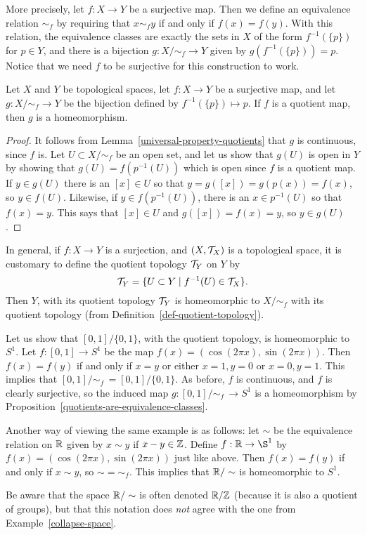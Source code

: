 More precisely, let $f :X \to Y$ be a surjective map. Then we define an equivalence relation $\sim_f$ by requiring that $x \sim_f y$ if and only if $f(x) = f(y)$. With this relation, the equivalence classes are exactly the sets in $X$ of the form $f^{-1}(\{p\})$ for $p \in Y$, and there is a bijection $g: X/\!\sim_f \to Y$ given by $g(f^{-1}(\{p\})) = p$. Notice that we need $f$ to be surjective for this construction to work.
\begin{prop}
  \label{quotients-are-equivalence-classes}
  Let $X$ and $Y$ be topological spaces, let $f : X \to Y$ be a surjective map, and let $g : X/ \!\sim_f \to Y$ be the bijection defined by $f^{-1}(\{p\}) \mapsto p$. If $f$ is a quotient map, then $g$ is a homeomorphism.
\end{prop}
\begin{proof}
  It follows from Lemma~\ref{universal-property-quotients} that $g$ is continuous, since $f$ is. Let $U \subset X/\!\sim_f$ be an open set, and let us show that $g(U)$ is open in $Y$ by showing that $g(U) = f(p^{-1}(U))$ which is open since $f$ is a quotient map. If $y \in g(U)$ there is an $[x] \in U$ so that $y = g([x]) = g(p(x)) = f(x)$, so $y \in f(U)$. Likewise, if $y \in f(p^{-1}(U))$, there is an $x \in p^{-1}(U)$ so that $f(x) = y$. This says that $[x] \in U$ and $g([x]) = f(x) = y$, so $y \in g(U)$.
\end{proof}
\begin{rem}
  In general, if $f : X \to Y$ is a surjection, and $(X,\mathcal{T}_X)$ is a topological space, it is customary to define the quotient topology $\mathcal{T}_Y$ on $Y$ by
  \[
    \mathcal{T}_Y = \{ U \subset Y \mid f^{-1}(U) \in \mathcal{T}_X \}.
  \]
  Then $Y$, with its quotient topology $\mathcal{T}_Y$ is homeomorphic to $X/\!\sim_f$ with its quotient topology (from Definition~\ref{def-quotient-topology}).
\end{rem}
\begin{example}
  \label{circle-from-interval}
  Let us show that $[0,1]/\{0,1\}$, with the quotient topology, is homeomorphic to $S^1$. Let $f : [0,1] \to S^1$ be the map $f(x) = (\cos(2\pi x), \sin(2\pi x))$. Then $f(x) = f(y)$ if and only if $x = y$ or either $x=1,y=0$ or $x=0,y=1$. This implies that $[0,1]/\!\sim_f\, = [0,1]/\{0,1\}$. As before, $f$ is continuous, and $f$ is clearly surjective, so the induced map $g : [0,1]/\!\sim_f \,\to S^1$ is a homeomorphism by Proposition~\ref{quotients-are-equivalence-classes}.
\end{example}
\begin{example}
  Another way of viewing the same example is as follows: let $\sim$ be the equivalence relation on $\mathbb{R}$ given by $x \sim y$ if $x-y \in \mathbb{Z}$. Define $f : \bbR \to \S^1$ by $f(x) = (\cos(2\pi x), \sin(2\pi x))$ just like above. Then $f(x) = f(y)$ if and only if $x \sim y$, so $\sim = \sim_f$. This implies that $\mathbb{R}/\sim$ is homeomorphic to $S^1$.
  
  Be aware that the space $\mathbb{R}/\sim$ is often denoted $\mathbb{R}/\mathbb{Z}$ (because it is also a quotient of groups), but that this notation does \emph{not} agree with the one from Example~\ref{collapse-space}.
\end{example}
